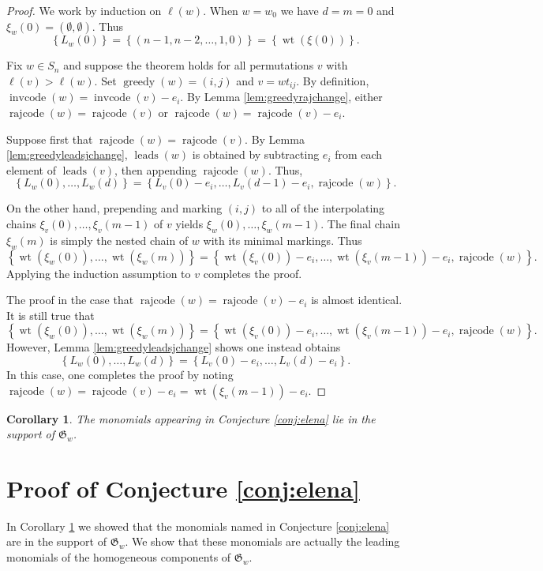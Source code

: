 \documentclass[11pt]{amsart}
\newtheorem{corollary}[theorem]{Corollary}
\theoremstyle{definition}
\theoremstyle{named}
\DeclareMathOperator{\cc}{\mathrm{invcode}} %
\DeclareMathOperator{\rr}{\mathrm{rajcode}} %
\DeclareMathOperator{\greedy}{\mathrm{greedy}}
\DeclareMathOperator{\leads}{\mathrm{leads}}
\DeclareMathOperator{\wt}{\mathrm{wt}}
\begin{document}
	\begin{proof}
		We work by induction on $\ell(w)$. When $w=w_0$ we have $d=m=0$ and $\xi_w(0) = (\emptyset,\emptyset)$. Thus
		\[\left\{ {L_w(0)}\right\} = \left\{(n-1,n-2,\ldots,1,0)\right\} = \left\{\wt({\xi(0)})\right\}. \] 
		
		Fix $w\in S_n$ and suppose the theorem holds for all permutations $v$ with $\ell(v)>\ell(w)$. Set $\greedy(w)=(i,j)$ and $v=wt_{ij}$. By definition, $\cc(w)=\cc(v)-e_i$. By Lemma \ref{lem:greedyrajchange}, either $\rr(w) = \rr(v)$ or $\rr(w) = \rr(v) - e_i$. 
		
		Suppose first that $\rr(w) = \rr(v)$. By Lemma \ref{lem:greedyleadsjchange}, $\leads(w)$ is obtained by subtracting $e_i$ from each element of $\leads(v)$, then appending $\rr(w)$.
		Thus,
		\[\left\{{L_w(0)},\ldots, {L_w(d)}\right\} = \left\{{L_v(0)}-e_i,\ldots, {L_v(d-1)}-e_i, \rr(w)\right\}.\]
		
		On the other hand, prepending and marking $(i,j)$ to all of the interpolating chains 
		$\xi_v(0),\ldots,\xi_v(m-1)$ of $v$ yields $\xi_w(0),\ldots, \xi_w(m-1)$. The final chain $\xi_w(m)$ is simply the nested chain of $w$ with its minimal markings. Thus
		\[\left\{\wt({\xi_w(0)}),\ldots,\wt({\xi_w(m)}) \right\} = \left\{\wt({\xi_v(0)})-e_i,\ldots,\wt({\xi_v(m-1)})-e_i,\rr(w) \right\}.\]
		Applying the induction assumption to $v$ completes the proof.
		
		The proof in the case that $\rr(w) = \rr(v) - e_i$ is almost identical. It is still true that
		\[\left\{\wt({\xi_w(0)}),\ldots,\wt({\xi_w(m)}) \right\} = \left\{\wt({\xi_v(0)})-e_i,\ldots,\wt({\xi_v(m-1)})-e_i,\rr(w) \right\}.\]
		However, Lemma \ref{lem:greedyleadsjchange} shows one instead obtains
		\[\left\{{L_w(0)},\ldots, {L_w(d)}\right\} = \left\{{L_v(0)}-e_i,\ldots, {L_v(d)}-e_i\right\}.\]
		In this case, one completes the proof by noting $\rr(w) =\rr(v)-e_i= \wt({\xi_v(m-1)})-e_i$.
	\end{proof}
	
	\begin{corollary} 
		\label{cor:exist} 
		The monomials appearing in Conjecture \ref{conj:elena} lie in the support of $\mathfrak{G}_w$.
	\end{corollary}


	\section{Proof of Conjecture \ref{conj:elena}}
	\label{sec:lead}
	
	In Corollary \ref{cor:exist} we showed that the monomials named in Conjecture \ref{conj:elena} are in the support of $\mathfrak{G}_w$. We show that these monomials are actually the leading monomials of the homogeneous components of $\mathfrak{G}_w$.
\end{document}
